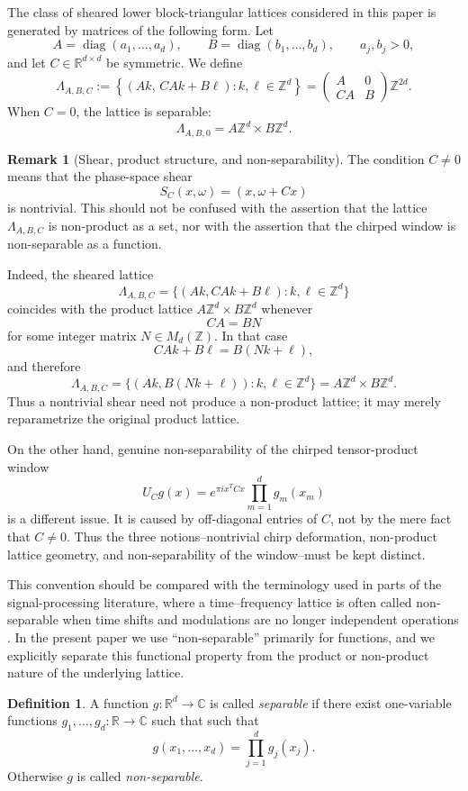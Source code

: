 \documentclass[final,1p,times,authoryear]{elsarticle}
\theoremstyle{definition}
\newtheorem{definition}[theorem]{Definition}
\newtheorem{remark}[theorem]{Remark}
\newcommand{\R}{\mathbb{R}}
\newcommand{\C}{\mathbb{C}}
\newcommand{\Z}{\mathbb{Z}}
\newcommand{\1}{\mathbf{1}}
\begin{document}
{The class of sheared lower block-triangular lattices considered in this paper is generated by matrices of the following form. Let}
$$
A=\operatorname{diag}(a_1,\dots,a_d),
\qquad
B=\operatorname{diag}(b_1,\dots,b_d),
\qquad a_j,b_j>0,
$$
and let $C\in \R^{d\times d}$ be symmetric. We define
$$
\Lambda_{A,B,C}
:=
\left\{
(Ak,\,CAk+B\ell):k,\ell\in \Z^d
\right\}
=
\begin{pmatrix}
A & 0\\
CA & B
\end{pmatrix}\Z^{2d}.
$$
When $C=0$, the lattice is separable:
$$
\Lambda_{A,B,0}=A\Z^d\times B\Z^d.
$$
\begin{remark}[Shear, product structure, and non-separability]
{The condition $C\neq 0$ means that the phase-space shear
$$
S_C(x,\omega)=(x,\omega+Cx)
$$
is nontrivial. This should not be confused with the assertion that the lattice
$\Lambda_{A,B,C}$ is non-product as a set, nor with the assertion that the chirped
window is non-separable as a function.}

{Indeed, the sheared lattice
$$
\Lambda_{A,B,C}
=
\{(Ak,CAk+B\ell):k,\ell\in\mathbb Z^d\}
$$
coincides with the product lattice $A\mathbb Z^d\times B\mathbb Z^d$ whenever
$$
CA=BN
$$
for some integer matrix $N\in M_d(\mathbb Z)$. In that case
$$
CAk+B\ell=B(Nk+\ell),
$$
and therefore
$$
\Lambda_{A,B,C}
=
\{(Ak,B(Nk+\ell)):k,\ell\in\mathbb Z^d\}
=
A\mathbb Z^d\times B\mathbb Z^d.
$$
Thus a nontrivial shear need not produce a non-product lattice; it may merely reparametrize
the original product lattice.}

{On the other hand, genuine non-separability of the chirped tensor-product window
$$
U_Cg(x)=e^{\pi i x^TCx}\prod_{m=1}^d g_m(x_m)
$$
is a different issue. It is caused by off-diagonal entries of $C$, not by the mere fact that
$C\neq0$. Thus the three notions--nontrivial chirp deformation, non-product lattice geometry,
and non-separability of the window--must be kept distinct.}
\end{remark}
This convention should be compared with the terminology used in parts of the signal-processing
literature, where a time--frequency lattice is often called non-separable when time shifts and
modulations are no longer independent operations \citep{VanLeestBastiaans2000,VanLeestBastiaans2004}.
In the present paper we use ``non-separable'' primarily for functions, and we explicitly separate
this functional property from the product or non-product nature of the underlying lattice.
\begin{definition}\label{def:separable}
A function $g:\R^d\to \C$ is called \emph{separable} if there exist one-variable functions
$g_1,\dots,g_d:\R\to\C$ such that such that
$$
g(x_1,\dots,x_d)=\prod_{j=1}^d g_j(x_j).
$$
Otherwise $g$ is called \emph{non-separable}.
\end{definition}
\end{document}
